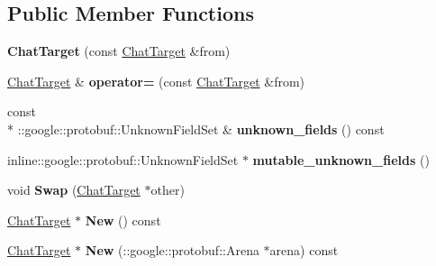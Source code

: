 \subsection*{Public Member Functions}
\begin{DoxyCompactItemize}
\item 
\hypertarget{classSimpleChat_1_1ChatTarget_a15dc4f81b37b35fa79f8b8b2a9e343bb}{{\bfseries Chat\-Target} (const \hyperlink{classSimpleChat_1_1ChatTarget}{Chat\-Target} \&from)}\label{classSimpleChat_1_1ChatTarget_a15dc4f81b37b35fa79f8b8b2a9e343bb}

\item 
\hypertarget{classSimpleChat_1_1ChatTarget_a5c22124ec3d1affa15f661f4fef9eba9}{\hyperlink{classSimpleChat_1_1ChatTarget}{Chat\-Target} \& {\bfseries operator=} (const \hyperlink{classSimpleChat_1_1ChatTarget}{Chat\-Target} \&from)}\label{classSimpleChat_1_1ChatTarget_a5c22124ec3d1affa15f661f4fef9eba9}

\item 
\hypertarget{classSimpleChat_1_1ChatTarget_a8f89893fda6f9746dded787b9c65a7a5}{const \\*
\-::google\-::protobuf\-::\-Unknown\-Field\-Set \& {\bfseries unknown\-\_\-fields} () const }\label{classSimpleChat_1_1ChatTarget_a8f89893fda6f9746dded787b9c65a7a5}

\item 
\hypertarget{classSimpleChat_1_1ChatTarget_aab4226f6d671e5e4a008bd5e889aa322}{inline\-::google\-::protobuf\-::\-Unknown\-Field\-Set $\ast$ {\bfseries mutable\-\_\-unknown\-\_\-fields} ()}\label{classSimpleChat_1_1ChatTarget_aab4226f6d671e5e4a008bd5e889aa322}

\item 
\hypertarget{classSimpleChat_1_1ChatTarget_a94869595abb80310c9be52a3003bfac6}{void {\bfseries Swap} (\hyperlink{classSimpleChat_1_1ChatTarget}{Chat\-Target} $\ast$other)}\label{classSimpleChat_1_1ChatTarget_a94869595abb80310c9be52a3003bfac6}

\item 
\hypertarget{classSimpleChat_1_1ChatTarget_ad04e89f9a6180979b13d06ffdbcc6e33}{\hyperlink{classSimpleChat_1_1ChatTarget}{Chat\-Target} $\ast$ {\bfseries New} () const }\label{classSimpleChat_1_1ChatTarget_ad04e89f9a6180979b13d06ffdbcc6e33}

\item 
\hypertarget{classSimpleChat_1_1ChatTarget_ad83821f89032d4bd3ca0b9b75c12c8fb}{\hyperlink{classSimpleChat_1_1ChatTarget}{Chat\-Target} $\ast$ {\bfseries New} (\-::google\-::protobuf\-::\-Arena $\ast$arena) const }\label{classSimpleChat_1_1ChatTarget_ad83821f89032d4bd3ca0b9b75c12c8fb}


\end{DoxyCompactItemize}
